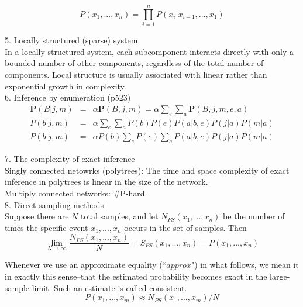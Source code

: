 \documentclass[12pt]{article}
\begin{document}
\begin{equation*}
P(x_1,...,x_n) = \prod^n_{i=1} P(x_i | x_{i-1},...,x_1)
\end{equation*}

5. Locally structured (sparse) system \\

In a locally structured system, each subcomponent interacts directly with only a bounded number of other components, regardless of the total number of components. Local structure is usually associated with linear rather than exponential growth in complexity. \\

6. Inference by enumeration (p523)
\begin{eqnarray*}
\boldsymbol{P}(B|j,m)
&=& \alpha \boldsymbol{P}(B,j,m)
= \alpha \sum_e \sum_a \boldsymbol{P}(B,j,m,e,a) \\
P(b|j,m)
&=& \alpha \sum_e \sum_a P(b) P(e) P(a|b,e) P(j|a) P(m|a) \\
P(b|j,m)
&=& \alpha P(b) \sum_e P(e) \sum_a P(a|b,e) P(j|a) P(m|a)
\end{eqnarray*}

7. The complexity of exact inference \\

Singly connected netowrks (polytrees): The time and space complexity of exact inference in polytrees is linear in the size of the network. \\

Multiply connected networks: \#P-hard. \\

8. Direct sampling methods \\

Suppose there are $N$ total samples, and let $N_{PS}(x_1,...,x_n)$ be the number of times the specific event $x_1,...,x_n$ occurs in the set of samples. Then
\begin{equation*}
  \lim_{N\rightarrow \infty} \frac {N_{PS}(x_1,...,x_n)}{N}
  = S_{PS}(x_1,...,x_n) = P(x_1,...,x_n)
\end{equation*}

Whenever we use an approximate equality (``$approx$") in what follows, we mean it in exactly this sense--that the estimated probability becomes exact in the large-sample limit. Such an estimate is called consistent.
\begin{equation*}
  P(x_1,...,x_m) \approx N_{PS}(x_1,...,x_m)/N
\end{equation*}
\end{document}
